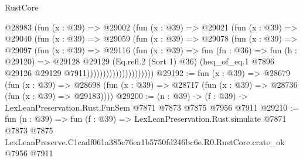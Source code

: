 \begin{lexlean}{RustCore}
\begin{coremodule}
                          @28983
                            (fun (x : @39) =>
                            @29002
                              (fun (x : @39) =>
                              @29021
                                (fun (x : @39) =>
                                @29040
                                  (fun (x : @39) =>
                                  @29059
                                    (fun (x : @39) =>
                                    @29078
                                      (fun (x : @39) =>
                                      @29097
                                        (fun (x : @39) =>
                                        @29116
                                          (fun (x : @39) =>
                                          fun (fn : @36) =>
                                          fun (h : @29120) =>
                                          @29128
                                            @29129
                                            (Eq.refl.{2} (Sort 1) @36)
                                            (heq_of_eq.{1}
                                              @7896
                                              @29126
                                              @29129
                                              @7911)))))))))))))))))))))
@29192 := fun (x : @39) =>
  @28679
    (fun (x : @39) =>
    @28698 (fun (x : @39) => @28717 (fun (x : @39) => @28736 (fun (x : @39) => @29183))))
@29200 := (n : @39) -> (f : @39) -> LexLeanPreservation.Rust.FunSem @7871 @7873 @7875 @7956 @7911
@29210 := fun (n : @39) =>
  fun (f : @39) =>
  LexLeanPreservation.Rust.simulate
    @7871
    @7873
    @7875
    LexLeanPreserve.C1cadf061a385c76ea1b5750fd246bc6e.R0.RustCore.crate_ok
    @7956
    @7911
\end{coremodule}
\end{lexlean}
